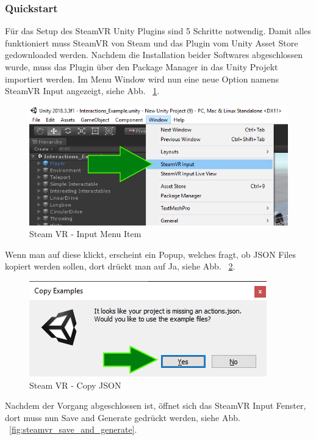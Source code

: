 \subsubsection{Quickstart}
Für das Setup des SteamVR Unity Plugins sind 5 Schritte notwendig.
Damit alles funktioniert muss SteamVR von Steam und das Plugin vom Unity Asset Store gedownloaded werden.
Nachdem die Installation beider Softwares abgeschlossen wurde, muss das Plugin über den Package Manager in das Unity Projekt importiert werden.
Im Menu Window wird nun eine neue Option namens SteamVR Input angezeigt, siehe Abb. ~\ref{fig:steamvr_input_menu_item}.
\begin {figure}
    \centering
    \includegraphics[scale=0.9]{pics/steamVR_Input_MenuItem}
    \caption{Steam VR - Input Menu Item}
    \label{fig:steamvr_input_menu_item}
\end {figure}
Wenn man auf diese klickt, erscheint ein Popup, welches fragt, ob JSON Files kopiert werden sollen, dort drückt man auf Ja, siehe Abb. ~\ref{fig:steamvr_copy_json}.
\begin {figure}
    \centering
    \includegraphics[scale=1]{pics/steamVR_Input_CopyJSON}
    \caption{Steam VR - Copy JSON}
    \label{fig:steamvr_copy_json}
\end {figure}
Nachdem der Vorgang abgeschlossen ist, öffnet sich das SteamVR Input Fenster, dort muss nun Save and Generate gedrückt werden, siehe Abb. ~\ref{fig:steamvr_save_and_generate}.
